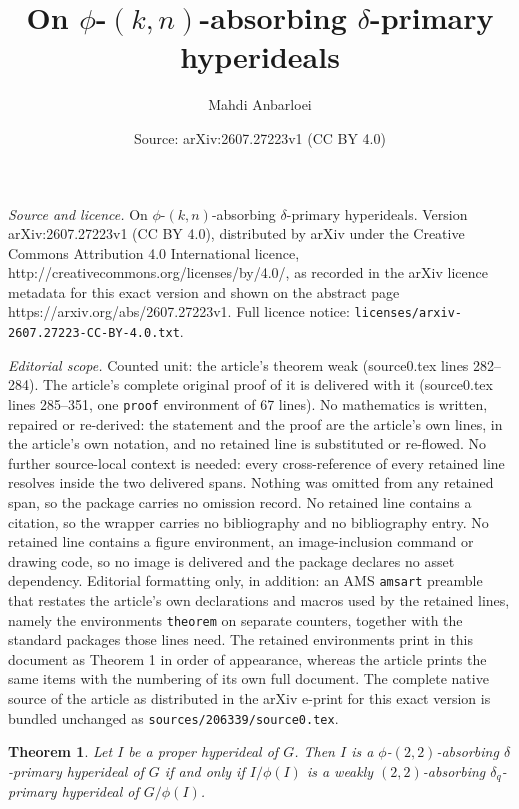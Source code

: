 \documentclass[10pt,a4paper]{amsart}
\title{On $\phi$-$(k,n)$-absorbing $\delta$-primary hyperideals}
\author{Mahdi Anbarloei}
\date{Source: arXiv:2607.27223v1 (CC BY 4.0)}
\newtheorem{theorem}{Theorem}
\begin{document}
\maketitle

\noindent\emph{Source and licence.} On $\phi$-$(k,n)$-absorbing $\delta$-primary hyperideals. Version arXiv:2607.27223v1 (CC BY 4.0), distributed by arXiv under the Creative Commons Attribution 4.0 International licence, http://creativecommons.org/licenses/by/4.0/, as recorded in the arXiv licence metadata for this exact version and shown on the abstract page https://arxiv.org/abs/2607.27223v1. Full licence notice: \texttt{licenses/arxiv-2607.27223-CC-BY-4.0.txt}.\par\smallskip

\noindent\textit{Editorial scope.} Counted unit: the article's theorem weak (source0.tex lines 282--284). The article's complete original proof of it is delivered with it (source0.tex lines 285--351, one \texttt{proof} environment of 67 lines). No mathematics is written, repaired or re-derived: the statement and the proof are the article's own lines, in the article's own notation, and no retained line is substituted or re-flowed.  No further source-local context is needed: every cross-reference of every retained line resolves inside the two delivered spans.  Nothing was omitted from any retained span, so the package carries no omission record.  No retained line contains a citation, so the wrapper carries no bibliography and no bibliography entry.  No retained line contains a figure environment, an image-inclusion command or drawing code, so no image is delivered and the package declares no asset dependency.  Editorial formatting only, in addition: an AMS \texttt{amsart} preamble that restates the article's own declarations and macros used by the retained lines, namely the environments \texttt{theorem} on separate counters, together with the standard packages those lines need.  The retained environments print in this document as Theorem 1 in order of appearance, whereas the article prints the same items with the numbering of its own full document.  The complete native source of the article as distributed in the arXiv e-print for this exact version is bundled unchanged as \texttt{sources/206339/source0.tex}.
\begin{theorem} \label{weak}
Let $I$ be a proper hyperideal of $G$. Then $I$  is   a  $\phi$-$(2,2)$-absorbing $\delta$-primary hyperideal of $G$ if and only if   $I/\phi(I)$ is a  weakly $(2,2)$-absorbing $\delta_q$-primary hyperideal of $G/\phi(I)$. 
\end{theorem}
\end{document}
